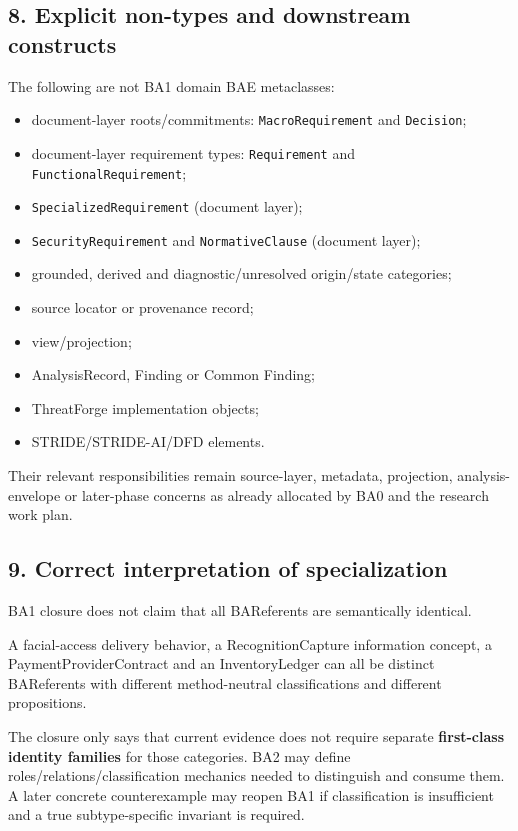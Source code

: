 \documentclass[
  10pt,
  a4paper,
]{article}
\providecommand{\tightlist}{%
  \setlength{\itemsep}{0pt}\setlength{\parskip}{0pt}}
\begin{document}
\subsection{8. Explicit non-types and downstream
constructs}\label{explicit-non-types-and-downstream-constructs}

The following are not BA1 domain BAE metaclasses:

\begin{itemize}
\tightlist
\item
  document-layer roots/commitments: \texttt{MacroRequirement} and
  \texttt{Decision};
\item
  document-layer requirement types: \texttt{Requirement} and
  \texttt{FunctionalRequirement};
\item
  \texttt{SpecializedRequirement} (document layer);
\item
  \texttt{SecurityRequirement} and \texttt{NormativeClause} (document
  layer);
\item
  grounded, derived and diagnostic/unresolved origin/state categories;
\item
  source locator or provenance record;
\item
  view/projection;
\item
  AnalysisRecord, Finding or Common Finding;
\item
  ThreatForge implementation objects;
\item
  STRIDE/STRIDE-AI/DFD elements.
\end{itemize}

Their relevant responsibilities remain source-layer, metadata,
projection, analysis-envelope or later-phase concerns as already
allocated by BA0 and the research work plan.

\subsection{9. Correct interpretation of
specialization}\label{correct-interpretation-of-specialization}

BA1 closure does not claim that all BAReferents are semantically
identical.

A facial-access delivery behavior, a RecognitionCapture information
concept, a PaymentProviderContract and an InventoryLedger can all be
distinct BAReferents with different method-neutral classifications and
different propositions.

The closure only says that current evidence does not require separate
\textbf{first-class identity families} for those categories. BA2 may
define roles/relations/classification mechanics needed to distinguish
and consume them. A later concrete counterexample may reopen BA1 if
classification is insufficient and a true subtype-specific invariant is
required.
\end{document}
